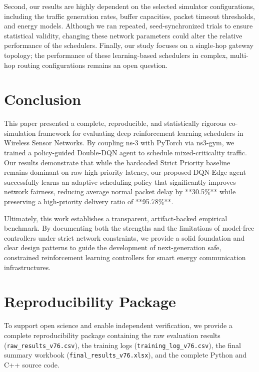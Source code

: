 \documentclass[runningheads,a4paper]{llncs}
\begin{document}
Second, our results are highly dependent on the selected simulator configurations, including the traffic generation rates, buffer capacities, packet timeout thresholds, and energy models. Although we ran repeated, seed-synchronized trials to ensure statistical validity, changing these network parameters could alter the relative performance of the schedulers. Finally, our study focuses on a single-hop gateway topology; the performance of these learning-based schedulers in complex, multi-hop routing configurations remains an open question.

\section{Conclusion}
This paper presented a complete, reproducible, and statistically rigorous co-simulation framework for evaluating deep reinforcement learning schedulers in Wireless Sensor Networks. By coupling ns-3 with PyTorch via ns3-gym, we trained a policy-guided Double-DQN agent to schedule mixed-criticality traffic. Our results demonstrate that while the hardcoded Strict Priority baseline remains dominant on raw high-priority latency, our proposed DQN-Edge agent successfully learns an adaptive scheduling policy that significantly improves network fairness, reducing average normal packet delay by **30.5\%** while preserving a high-priority delivery ratio of **95.78\%**. 

Ultimately, this work establishes a transparent, artifact-backed empirical benchmark. By documenting both the strengths and the limitations of model-free controllers under strict network constraints, we provide a solid foundation and clear design patterns to guide the development of next-generation safe, constrained reinforcement learning controllers for smart energy communication infrastructures.

\section{Reproducibility Package}
To support open science and enable independent verification, we provide a complete reproducibility package containing the raw evaluation results (\texttt{raw\_results\_v76.csv}), the training logs (\texttt{training\_log\_v76.csv}), the final summary workbook (\texttt{final\_results\_v76.xlsx}), and the complete Python and C++ source code.



\end{document}
